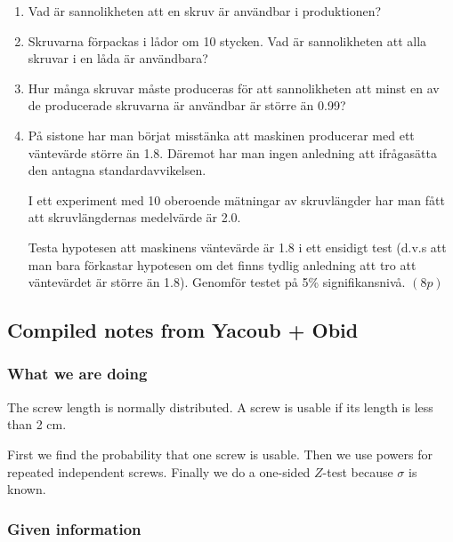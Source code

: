 \documentclass[10pt]{article}
\begin{document}
\begin{enumerate}[label=\alph*)]
\item Vad är sannolikheten att en skruv är användbar
i produktionen?

\item Skruvarna förpackas i lådor om 10 stycken.
Vad är sannolikheten att alla skruvar i en låda är
användbara?

\item Hur många skruvar måste produceras för att
sannolikheten att minst en av de producerade
skruvarna är användbar är större än 0.99?

\item På sistone har man börjat misstänka att
maskinen producerar med ett väntevärde större än
1.8. Däremot har man ingen anledning att ifrågasätta
den antagna standardavvikelsen.

I ett experiment med 10 oberoende mätningar av
skruvlängder har man fått att skruvlängdernas
medelvärde är 2.0.

Testa hypotesen att maskinens väntevärde är 1.8 i
ett ensidigt test (d.v.s att man bara förkastar
hypotesen om det finns tydlig anledning att tro att
väntevärdet är större än 1.8). Genomför testet på
5\% signifikansnivå. \((8p)\)
\end{enumerate}

\subsection*{Compiled notes from Yacoub + Obid}

\subsubsection*{What we are doing}

The screw length is normally distributed.
A screw is usable if its length is less than 2 cm.

First we find the probability that one screw is
usable. Then we use powers for repeated independent
screws. Finally we do a one-sided \(Z\)-test because
\(\sigma\) is known.

\subsubsection*{Given information}
\end{document}
